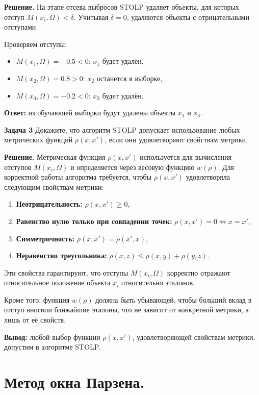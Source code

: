 \textbf{Решение.}  
На этапе отсева выбросов STOLP удаляет объекты, для которых отступ \(M(x_i, \Omega) < \delta\). Учитывая \(\delta = 0\), удаляются объекты с отрицательными отступами.  

Проверяем отступы:  
\begin{itemize}
    \item \(M(x_1, \Omega) = -0.5 < 0\): \(x_1\) будет удалён,  
    \item \(M(x_2, \Omega) = 0.8 > 0\): \(x_2\) останется в выборке,  
    \item \(M(x_3, \Omega) = -0.2 < 0\): \(x_3\) будет удалён.  
\end{itemize}

\textbf{Ответ:} из обучающей выборки будут удалены объекты \(x_1\) и \(x_3\).

\textbf{Задача 3}
Докажите, что алгоритм STOLP допускает использование любых метрических функций \( \rho(x, x') \), если они удовлетворяют свойствам метрики.

\textbf{Решение.}  
Метрическая функция \( \rho(x, x') \) используется для вычисления отступов \(M(x_i, \Omega)\) и определяется через весовую функцию \(w(\rho)\). Для корректной работы алгоритма требуется, чтобы \( \rho(x, x') \) удовлетворяла следующим свойствам метрики:
\begin{enumerate}
    \item \textbf{Неотрицательность:} \(\rho(x, x') \geq 0\),  
    \item \textbf{Равенство нулю только при совпадении точек:} \(\rho(x, x') = 0 \iff x = x'\),  
    \item \textbf{Симметричность:} \(\rho(x, x') = \rho(x', x)\),  
    \item \textbf{Неравенство треугольника:} \(\rho(x, z) \leq \rho(x, y) + \rho(y, z)\).  
\end{enumerate}

Эти свойства гарантируют, что отступы \(M(x_i, \Omega)\) корректно отражают относительное положение объекта \(x_i\) относительно эталонов.  

Кроме того, функция \(w(\rho)\) должна быть убывающей, чтобы больший вклад в отступ вносили ближайшие эталоны, что не зависит от конкретной метрики, а лишь от её свойств.

\textbf{Вывод:} любой выбор функции \( \rho(x, x') \), удовлетворяющей свойствам метрики, допустим в алгоритме STOLP.

\section{Метод окна Парзена.}

